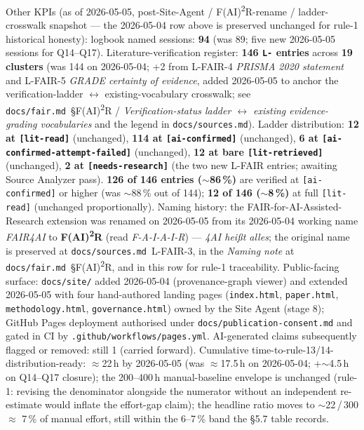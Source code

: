 \documentclass[11pt,a4paper]{article}
\begin{document}
Other KPIs (as of 2026-05-05, post-Site-Agent / F(AI)\textsuperscript{2}R-rename / ladder-crosswalk
snapshot --- the 2026-05-04 row above is preserved unchanged for rule-1
historical honesty): logbook named sessions: \textbf{94} (was 89; five new
2026-05-05 sessions for Q14--Q17). Literature-verification register:
\textbf{146 \texttt{L-} entries} across \textbf{19 clusters} (was 144 on
2026-05-04; +2 from L-FAIR-4 \emph{PRISMA 2020 statement} and L-FAIR-5
\emph{GRADE certainty of evidence}, added 2026-05-05 to anchor the
verification-ladder $\leftrightarrow$ existing-vocabulary crosswalk; see
\texttt{docs/fair.md}~\S{}F(AI)\textsuperscript{2}R / \emph{Verification-status ladder
$\leftrightarrow$ existing evidence-grading vocabularies} and the legend
in \texttt{docs/sources.md}). Ladder distribution: \textbf{12 at
\texttt{[lit-read]}} (unchanged), \textbf{114 at \texttt{[ai-confirmed]}}
(unchanged), \textbf{6 at \texttt{[ai-confirmed-attempt-failed]}}
(unchanged), \textbf{12 at bare \texttt{[lit-retrieved]}} (unchanged),
\textbf{2 at \texttt{[needs-research]}} (the two new L-FAIR entries;
awaiting Source Analyzer pass). \textbf{126 of 146 entries
($\sim$86\,\%)} are verified at \texttt{[ai-confirmed]} or higher (was
$\sim$88\,\% out of 144); \textbf{12 of 146 ($\sim$8\,\%)} at full
\texttt{[lit-read]} (unchanged proportionally). Naming history: the
FAIR-for-AI-Assisted-Research extension was renamed on 2026-05-05 from
its 2026-05-04 working name \emph{FAIR4AI} to
\textbf{F(AI)\textsuperscript{2}R} (read \emph{F-A-I-A-I-R}) ---
\emph{4AI hei\ss{}t alles}; the original name is preserved at
\texttt{docs/sources.md}~L-FAIR-3, in the \emph{Naming note} at
\texttt{docs/fair.md}~\S{}F(AI)\textsuperscript{2}R, and in this row for
rule-1 traceability. Public-facing surface:
\texttt{docs/site/} added 2026-05-04 (provenance-graph viewer) and
extended 2026-05-05 with four hand-authored landing pages
(\texttt{index.html}, \texttt{paper.html}, \texttt{methodology.html},
\texttt{governance.html}) owned by the Site Agent (stage 8); GitHub
Pages deployment authorised under \texttt{docs/publication-consent.md}
and gated in CI by \texttt{.github/workflows/pages.yml}. AI-generated
claims subsequently flagged or removed: still 1 (carried forward).
Cumulative time-to-rule-13/14-distribution-ready: $\approx$22\,h by
2026-05-05 (was $\approx$17.5\,h on 2026-05-04; +$\sim$4.5\,h on
Q14--Q17 closure); the 200--400\,h manual-baseline envelope is unchanged
(rule-1: revising the denominator alongside the numerator without an
independent re-estimate would inflate the effort-gap claim); the
headline ratio moves to $\sim$22\,/\,300 $\approx$ 7\,\% of manual
effort, still within the 6--7\,\% band the \S{}5.7 table records.
\end{document}
